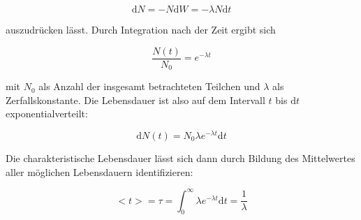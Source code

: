 \begin{equation}
    \text{d}N = -N\text{d}W = -\lambda N\text{d}t 
\end{equation}

auszudrücken lässt. Durch Integration nach der Zeit ergibt sich 

\begin{equation}
    \frac{N(t)}{N_0} = e^{-\lambda t}
\end{equation}

mit $N_0$ als Anzahl der insgesamt betrachteten Teilchen und $\lambda$ als Zerfallskonstante. Die Lebensdauer ist also auf dem Intervall $t$ bis $\text{d}t$ exponentialverteilt:

\begin{equation}
    \text{d}N(t) = N_0 \lambda e^{-\lambda t} \text{d}t
\end{equation}

Die charakteristische Lebensdauer lässt sich dann durch Bildung des Mittelwertes aller möglichen Lebensdauern identifizieren: 

\begin{equation}
    <t> = \tau = \int_0^{\infty} \lambda e^{-\lambda t} \text{d}t = \frac{1}{\lambda}
\end{equation}